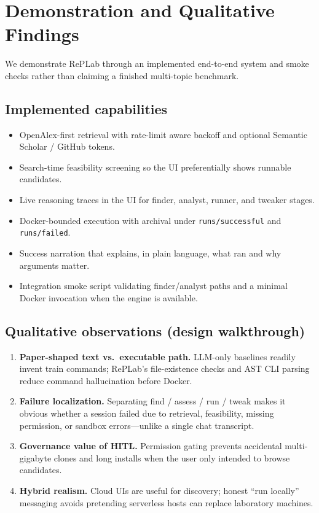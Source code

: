 \documentclass[11pt,a4paper]{article}
\begin{document}
\section{Demonstration and Qualitative Findings}
\label{sec:results}

We demonstrate RePLab through an implemented end-to-end system and smoke checks
rather than claiming a finished multi-topic benchmark.

\subsection{Implemented capabilities}
\begin{itemize}[leftmargin=*,itemsep=2pt]
  \item OpenAlex-first retrieval with rate-limit aware backoff and optional
        Semantic Scholar / GitHub tokens.
  \item Search-time feasibility screening so the UI preferentially shows
        runnable candidates.
  \item Live reasoning traces in the UI for finder, analyst, runner, and
        tweaker stages.
  \item Docker-bounded execution with archival under \texttt{runs/successful}
        and \texttt{runs/failed}.
  \item Success narration that explains, in plain language, what ran and why
        arguments matter.
  \item Integration smoke script validating finder/analyst paths and a minimal
        Docker invocation when the engine is available.
\end{itemize}

\subsection{Qualitative observations (design walkthrough)}
\begin{enumerate}[leftmargin=*,itemsep=3pt]
  \item \textbf{Paper-shaped text vs.\ executable path.}
        LLM-only baselines readily invent train commands; RePLab's file-existence
        checks and AST CLI parsing reduce command hallucination before Docker.
  \item \textbf{Failure localization.}
        Separating find / assess / run / tweak makes it obvious whether a
        session failed due to retrieval, feasibility, missing permission, or
        sandbox errors---unlike a single chat transcript.
  \item \textbf{Governance value of HITL.}
        Permission gating prevents accidental multi-gigabyte clones and long
        installs when the user only intended to browse candidates.
  \item \textbf{Hybrid realism.}
        Cloud UIs are useful for discovery; honest ``run locally'' messaging
        avoids pretending serverless hosts can replace laboratory machines.
\end{enumerate}
\end{document}
